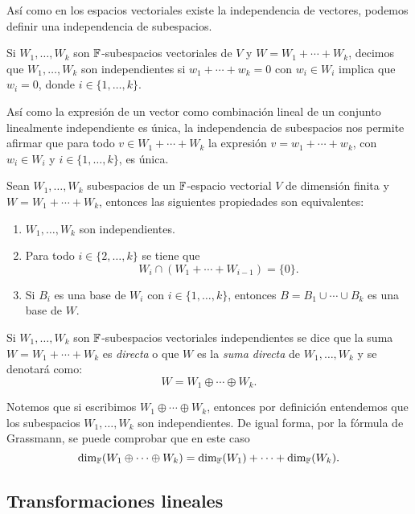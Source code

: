 Así como en los espacios vectoriales existe la independencia de vectores, podemos definir una independencia de subespacios.

\begin{defi}
  Si $W_1, \ldots, W_k$ son $\mathbb{F}$-subespacios vectoriales de $V$ y $W = W_1 + \cdots + W_k$, decimos que  $W_1, \ldots, W_k$ son independientes si $w_1 + \cdots + w_k = 0$ con $w_i \in W_i$ implica que $w_i = 0$, donde $i \in \{1,\ldots,k\}$.
\end{defi}

Así como la expresión de un vector como combinación lineal de un conjunto linealmente independiente es única, la independencia de subespacios nos permite afirmar que para todo $v \in W_1 + \cdots + W_k$ la expresión $v = w_1 + \cdots + w_k$, con $w_i \in W_i$ y $i \in \{1, \ldots, k\}$, es única.
\begin{teor}
  Sean $W_1, \ldots, W_k$ subespacios de un $\mathbb{F}$-espacio vectorial $V$ de dimensión finita y $W = W_1 + \cdots + W_k$, entonces las siguientes propiedades son equivalentes:
  \begin{enumerate}
    \item $W_1, \ldots, W_k$ son independientes.
    \item Para todo $i \in \{2, \ldots, k\}$ se tiene que
            \[ W_i \cap (W_1 + \cdots + W_{i-1})  = \{0\}. \]
    \item Si $B_i$ es una base de $W_i$ con $i \in \{1, \ldots, k\}$, entonces $B = B_1 \cup  \cdots \cup  B_k$ es una base de $W$.
  \end{enumerate}
\end{teor}

\begin{defi}
  Si $W_1, \ldots, W_k$ son $\mathbb{F}$-subespacios vectoriales independientes se dice que la suma $W = W_1 + \cdots + W_k$ es \emph{directa} o que $W$ es la \emph{suma directa} de  $W_1, \ldots, W_k$ y se denotará como:
    \[ W =  W_1 \oplus \cdots \oplus W_k.\]
\end{defi}

Notemos que si escribimos $W_1 \oplus \cdots \oplus W_k$, entonces por definición entendemos que los subespacios $W_1, \ldots, W_k$ son independientes. De igual forma, por la fórmula de Grassmann, se puede comprobar que en este caso
\[ \dim_{\mathbb{F}} (W_1 \oplus \cdots \oplus W_k) = \dim_{\mathbb{F}} (W_1) + \cdots + \dim_{\mathbb{F}} (W_k).\]

\subsection{Transformaciones lineales}

